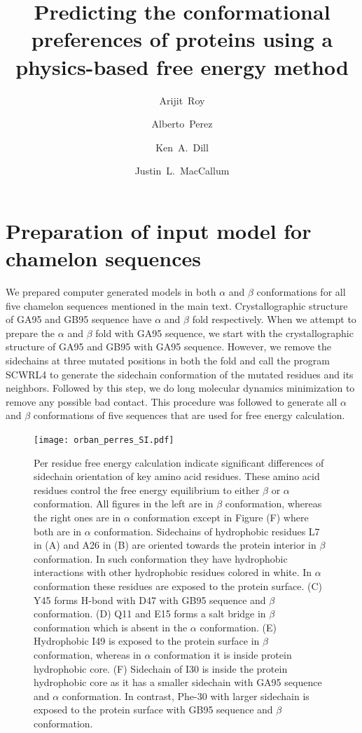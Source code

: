 \documentclass[12pt]{article}
\author{Arijit~Roy}
\author{Alberto~Perez}
\author{Ken~A.~Dill}
\author{Justin~L.~MacCallum}
\affil{Laufer Center for Physical and Quantitative Biology\\
    and Departments of Physics and Chemistry\\
    Stony Brook University\\
    Stony Brook, NY 11794-5252.}
\title{Predicting the conformational preferences of proteins using a physics-based free energy
method}
\begin{document}
\maketitle


\section{Preparation of input model for chamelon sequences}

We prepared computer generated models in both $\alpha$ and $\beta$ conformations for all five chamelon sequences mentioned 
in the main text. Crystallographic structure of GA95 and GB95 sequence have $\alpha$ and $\beta$ fold respectively. When
we attempt to prepare the $\alpha$ and $\beta$ fold with GA95 sequence, we start with the crystallographic 
structure of GA95 and GB95 with GA95 sequence. However, we remove the sidechains at three mutated positions in both the fold 
and call the program SCWRL4 \cite{Krivov2009} to generate the sidechain conformation of the mutated residues and its neighbors. Followed by 
this step, we do long molecular dynamics
minimization to remove any possible bad contact. This procedure was followed to generate all $\alpha$ and 
$\beta$ conformations of five sequences that are used for free energy calculation.   

\setcounter{figure}{0}
\makeatletter 
\renewcommand{\thefigure}{S\@arabic\c@figure}
\begin{figure}
\texttt{[image: orban\_perres\_SI.pdf]}
\label{fig:orban_full}
\caption{Per residue free energy calculation indicate significant differences of sidechain orientation of key amino acid residues. These amino acid
residues control the free energy equilibrium to either $\beta$ or
$\alpha$ conformation. All figures in the left are in $\beta$ conformation, whereas the right ones are in $\alpha$ conformation except in Figure (F) 
where both are in $\alpha$ conformation.
Sidechains of hydrophobic residues L7 in (A) and A26 in (B) are oriented towards the protein interior in $\beta$ 
conformation. In such conformation they have hydrophobic interactions with other hydrophobic residues colored in white. In $\alpha$ conformation these residues are 
exposed to the protein surface.  
(C) Y45 forms H-bond with D47 with GB95 sequence and $\beta$ conformation. (D) Q11 and E15 forms a salt bridge in $\beta$ conformation which is absent
in the $\alpha$ conformation. (E) Hydrophobic I49 is exposed to the protein surface in $\beta$ conformation, whereas in $\alpha$ conformation it 
is inside protein hydrophobic core. (F) Sidechain of I30 is inside the protein hydrophobic core as it has a smaller sidechain with GA95 sequence 
and $\alpha$ conformation. In contrast, Phe-30 with larger sidechain is exposed to the protein surface with GB95 sequence and $\beta$ conformation.}
\end{figure}
\end{document}
